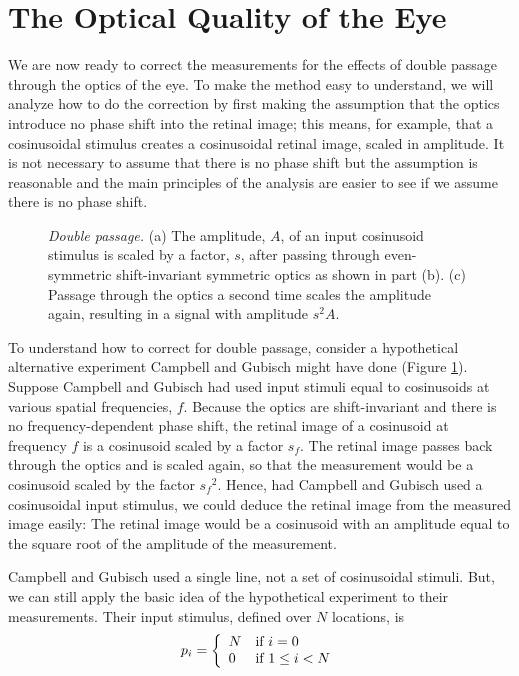 \section{The Optical Quality of the Eye}
We are now ready to correct the measurements
for the effects
of double passage through the optics of the eye.
To make the method easy to understand,
we will analyze how to do the correction 
by first making the assumption that the optics introduce
no phase shift into the retinal image;
this means, for example, that
a cosinusoidal stimulus
creates a cosinusoidal retinal image, scaled in amplitude.
It is not necessary to assume that there is no phase shift but
the assumption is reasonable
and the main principles of the analysis are easier to see
if we assume there is no phase shift.

\begin{figure}
\centerline{
}
\caption[Sinusoids and Double Passage]{ 
{\em Double passage.}
(a) The amplitude, $A$, of an input cosinusoid stimulus
is scaled by a factor, $s$, after passing
through even-symmetric shift-invariant symmetric optics
as shown in part (b).
(c) Passage through the optics a second
time scales the amplitude again, resulting
in a signal with amplitude $s^2 A$.
}
\label{f1:doublepass}
\end{figure}
To understand how to correct for double passage, consider
a hypothetical alternative experiment Campbell and Gubisch might have done
(Figure \ref{f1:doublepass}).
Suppose Campbell and Gubisch had used input stimuli equal
to cosinusoids at various spatial frequencies, $f$.
Because the optics are shift-invariant and there is no frequency-dependent phase shift,
the retinal image of a cosinusoid at frequency $f$ 
is a cosinusoid scaled by a factor $s_f$.
The retinal image passes back through the optics
and is scaled again, so that the measurement
would be a cosinusoid scaled by the factor ${s_f}^2$.
Hence, had Campbell and Gubisch used a cosinusoidal input stimulus, 
we could deduce the retinal image from the measured image easily:
The retinal image would be a cosinusoid with an amplitude
equal to the square root of the amplitude of the measurement.

Campbell and Gubisch used a single
line, not a set of cosinusoidal stimuli.
But, we can still apply the basic idea of
the hypothetical experiment to their measurements.
Their input stimulus, defined over $N$ locations, is
\begin{equation}
\mbox{$p_{i}$} =
 \left\{ 
  \begin{array}{ll}
   N & \mbox{if $i=0$} \\
   0 & \mbox{if $1 \leq i < N$}
  \end{array}
 \right.
\end{equation}

